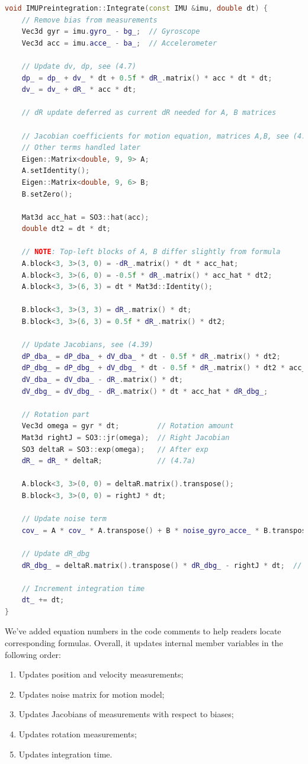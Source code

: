 \begin{lstlisting}[language=c++,caption=src/ch4/imu\_preintegration.cc]
void IMUPreintegration::Integrate(const IMU &imu, double dt) {
	// Remove bias from measurements
	Vec3d gyr = imu.gyro_ - bg_;  // Gyroscope
	Vec3d acc = imu.acce_ - ba_;  // Accelerometer
	
	// Update dv, dp, see (4.7)
	dp_ = dp_ + dv_ * dt + 0.5f * dR_.matrix() * acc * dt * dt;
	dv_ = dv_ + dR_ * acc * dt;
	
	// dR update deferred as current dR needed for A, B matrices
	
	// Jacobian coefficients for motion equation, matrices A,B, see (4.29)
	// Other terms handled later
	Eigen::Matrix<double, 9, 9> A;
	A.setIdentity();
	Eigen::Matrix<double, 9, 6> B;
	B.setZero();
	
	Mat3d acc_hat = SO3::hat(acc);
	double dt2 = dt * dt;
	
	// NOTE: Top-left blocks of A, B differ slightly from formula
	A.block<3, 3>(3, 0) = -dR_.matrix() * dt * acc_hat;
	A.block<3, 3>(6, 0) = -0.5f * dR_.matrix() * acc_hat * dt2;
	A.block<3, 3>(6, 3) = dt * Mat3d::Identity();
	
	B.block<3, 3>(3, 3) = dR_.matrix() * dt;
	B.block<3, 3>(6, 3) = 0.5f * dR_.matrix() * dt2;
	
	// Update Jacobians, see (4.39)
	dP_dba_ = dP_dba_ + dV_dba_ * dt - 0.5f * dR_.matrix() * dt2;                      // (4.39d)
	dP_dbg_ = dP_dbg_ + dV_dbg_ * dt - 0.5f * dR_.matrix() * dt2 * acc_hat * dR_dbg_;  // (4.39e)
	dV_dba_ = dV_dba_ - dR_.matrix() * dt;                                             // (4.39b)
	dV_dbg_ = dV_dbg_ - dR_.matrix() * dt * acc_hat * dR_dbg_;                         // (4.39c)
	
	// Rotation part
	Vec3d omega = gyr * dt;         // Rotation amount
	Mat3d rightJ = SO3::jr(omega);  // Right Jacobian
	SO3 deltaR = SO3::exp(omega);   // After exp
	dR_ = dR_ * deltaR;             // (4.7a)
	
	A.block<3, 3>(0, 0) = deltaR.matrix().transpose();
	B.block<3, 3>(0, 0) = rightJ * dt;
	
	// Update noise term
	cov_ = A * cov_ * A.transpose() + B * noise_gyro_acce_ * B.transpose();
	
	// Update dR_dbg
	dR_dbg_ = deltaR.matrix().transpose() * dR_dbg_ - rightJ * dt;  // (4.39a)
	
	// Increment integration time
	dt_ += dt;
}
\end{lstlisting}

We've added equation numbers in the code comments to help readers locate corresponding formulas. Overall, it updates internal member variables in the following order:
\begin{enumerate}
	\item Updates position and velocity measurements;
	\item Updates noise matrix for motion model;
	\item Updates Jacobians of measurements with respect to biases;
	\item Updates rotation measurements;
	\item Updates integration time.
\end{enumerate}


